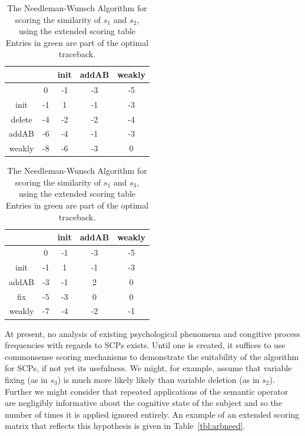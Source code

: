 \documentclass{article}
\begin{document}
\begin{table}
\begin{center}

\begin{tabular}{ c | c c c c}
& & init & addAB & weakly  \\ \hline
& 0 & -1 & -3 & -5  \\

init & -1 & 1 & -1 & -3 \\

delete & -4 &-2  & -2 & -4 \\

addAB & -6 & -4  & -1 & -3 \\

weakly & -8 & -6 & -3 & 0   \\
 
\end{tabular}
\caption{The Needleman-Wunsch Algorithm for scoring the similarity of $s_1$ and $s_2$, using the extended scoring table Entries in green are part of the optimal traceback.}
\label{tbl:exneeds1s2}

\end{center}
\end{table}


\begin{table}
\begin{center}

\begin{tabular}{ c | c c c c}
& & init & addAB & weakly  \\ \hline
& 0 & -1 & -3 & -5  \\

init & -1 & 1  & -1 & -3 \\

addAB & -3 & -1  & 2 & 0 \\

fix & -5 & -3 & 0 & 0 \\

weakly & -7 & -4 & -2 & -1   \\
 
\end{tabular}
\caption{The Needleman-Wunsch Algorithm for scoring the similarity of $s_1$ and $s_3$, using the extended scoring table Entries in green are part of the optimal traceback.}
\label{tbl:exneeds1s3}

\end{center}
\end{table}


At present, no analysis of existing psychological phenomena and congitive process frequencies with regards to SCPs exists. Until one is created, it suffices to use commonsense scoring mechanisms to demonstrate the suitability of the algorithm for SCPs, if not yet its usefulness. We might, for example, assume that variable fixing (as in $s_3$) is much more likely likely than variable deletion (as in $s_2$). Further we might consider that repeated applications of the semantic operator are negligibly informative about the cognitive state of the subject and so the number of times it is applied ignored entirely. An example of an extended scoring matrix that reflects this hypothesis is given in Table~\ref{tbl:arbneed}. 
\end{document}
